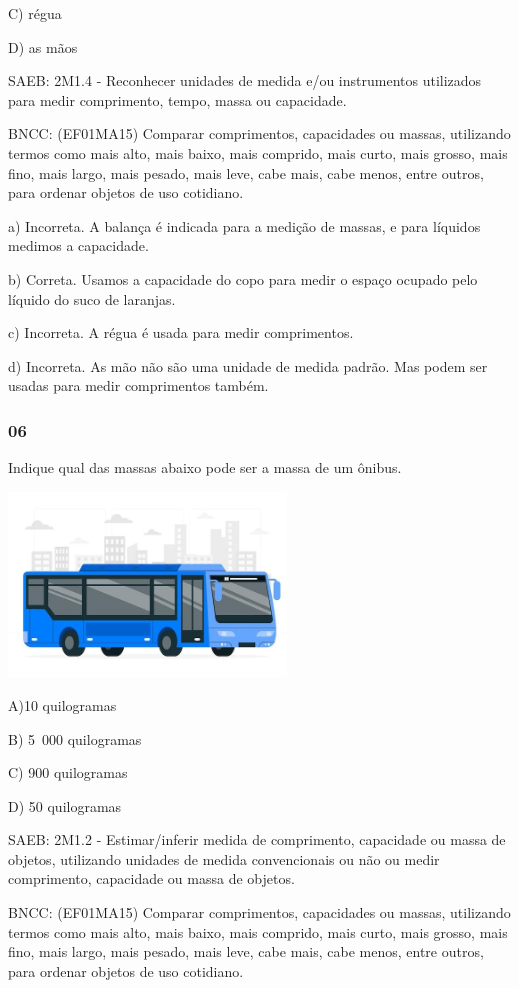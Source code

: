 \begin{itemize}
\begin{itemize}
C) régua

D) as mãos

SAEB: 2M1.4 - Reconhecer unidades de medida e/ou instrumentos utilizados
para medir comprimento, tempo, massa ou capacidade.

BNCC: (EF01MA15) Comparar comprimentos, capacidades ou massas,
utilizando termos como mais alto, mais baixo, mais comprido, mais curto,
mais grosso, mais fino, mais largo, mais pesado, mais leve, cabe mais,
cabe menos, entre outros, para ordenar objetos de uso cotidiano.

a) Incorreta. A balança é indicada para a medição de massas, e para
líquidos medimos a capacidade.

b) Correta. Usamos a capacidade do copo para medir o espaço ocupado pelo
líquido do suco de laranjas.

c) Incorreta. A régua é usada para medir comprimentos.

d) Incorreta. As mão não são uma unidade de medida padrão. Mas podem ser
usadas para medir comprimentos também.

\subsubsection{06}\label{section-137}

Indique qual das massas abaixo pode ser a massa de um ônibus.

\includegraphics[width=2.90249in,height=1.93351in]{media/image153.jpg}

A)10 quilogramas

B) 5~000 quilogramas

C) 900 quilogramas

D) 50 quilogramas

SAEB: 2M1.2 - Estimar/inferir medida de comprimento, capacidade ou massa
de objetos, utilizando unidades de medida convencionais ou não ou medir
comprimento, capacidade ou massa de objetos.

BNCC: (EF01MA15) Comparar comprimentos, capacidades ou massas,
utilizando termos como mais alto, mais baixo, mais comprido, mais curto,
mais grosso, mais fino, mais largo, mais pesado, mais leve, cabe mais,
cabe menos, entre outros, para ordenar objetos de uso cotidiano.


\end{itemize}
\end{itemize}
